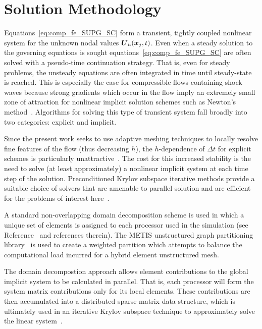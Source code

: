\section{Solution Methodology\label{sec:comp_solution_methodology}}
Equations~\eqref{eq:comp_fe_SUPG_SC} form a transient, tightly coupled nonlinear system for the unknown nodal values ${\boldsymbol{U}}_h({\boldsymbol{x}}_j,t)$.  Even when a steady solution to the governing equations is sought equations~\eqref{eq:comp_fe_SUPG_SC} are often solved with a pseudo-time continuation strategy.  That is, even for steady problems, the unsteady equations are often integrated in time until steady-state is reached.  This is especially the case for compressible flows containing shock waves because strong gradients which occur in the flow imply an extremely small zone of attraction for nonlinear implicit solution schemes such as Newton's method~\cite{gkks01,hm99}. Algorithms for solving this type of transient system fall broadly into two categories: explicit and implicit.

Since the present work seeks to use adaptive meshing techniques to locally resolve fine features of the flow (thus decreasing $h$), the $h$-dependence of $\Delta t$ for explicit schemes is particularly unattractive~\cite{cfmht}. The cost for this increased stability is the need to solve (at least approximately) a nonlinear implicit system at each time step of the solution.  Preconditioned Krylov subspace iterative methods provide a suitable choice of solvers that are amenable to parallel solution and are efficient for the problems of interest here~\cite{KKS99}.

A standard non-overlapping domain decomposition scheme is used in which a unique set of elements is assigned to each processor used in the simulation (see Reference~ and references therein).  The METIS unstructured graph partitioning library~\cite{karypis:metis} is used to create a weighted partition which attempts to balance the computational load incurred for a hybrid element unstructured mesh.  

The domain decompostion approach allows element contributions to the global implicit system to be calculated in parallel.  That is, each processor will form the system matrix contributions only for its local elements.  These contributions are then accumulated into a distributed sparse matrix data structure, which is ultimately used in an iterative Krylov subspace technique to approximately solve the linear system~\cite{libMeshPaper,benkirk_dissertation,petsc_manual}.

